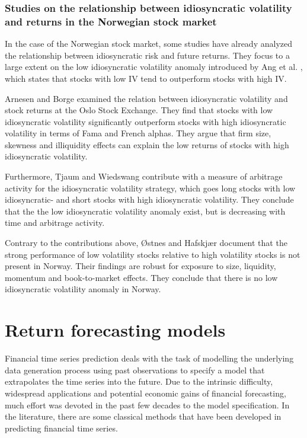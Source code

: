 \subsubsection{Studies on the relationship between idiosyncratic volatility and returns in the Norwegian stock market}

In the case of the Norwegian stock market, some studies have already analyzed the relationship between idiosyncratic risk and future returns. They focus to a large extent on the low idiosyncratic volatility anomaly introduced by Ang et al. \cite{angetal06}, which states that stocks with low IV tend to outperform stocks with high IV. 

Arnesen and Borge \cite{arnborge} examined the relation between idiosyncratic volatility and stock returns at the Oslo Stock Exchange. They find that stocks with low idiosyncratic volatility significantly outperform stocks with high idiosyncratic volatility in terms of Fama and French \cite{famafrench} alphas. They argue that firm size, skewness and illiquidity effects can explain the low returns of stocks with high idiosyncratic volatility.

Furthermore, Tjaum and Wiedswang \cite{thaumwiedswang} contribute with a measure of arbitrage activity for the idiosyncratic volatility strategy, which goes long stocks with low idiosyncratic- and short stocks with high idiosyncratic volatility. They conclude that the the low idiosyncratic volatility anomaly exist, but is decreasing with time and arbitrage activity. 

Contrary to the contributions above, Østnes and Hafskjær \cite{ostnes} document that the strong performance of low volatility stocks relative to high volatility stocks is not present in Norway. Their findings are robust for exposure to size, liquidity, momentum and book-to-market effects. They conclude that there is no low idiosyncratic volatility anomaly in Norway.


\section{Return forecasting models}

Financial time series prediction deals with the task of modelling the underlying data generation process using past observations to specify a model that extrapolates the time series into the future. Due to the intrinsic difficulty, widespread applications and potential economic gains of financial forecasting, much effort was devoted in the past few decades to the model specification. In the literature, there are some classical methods that have been developed in predicting financial time series. 

